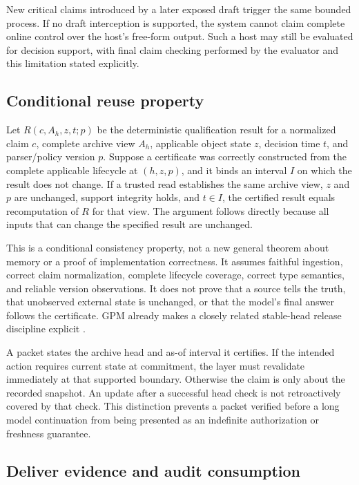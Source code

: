 New critical claims introduced by a later exposed draft trigger the same
bounded process. If no draft interception is supported, the system
cannot claim complete online control over the host's free-form output.
Such a host may still be evaluated for decision support, with final
claim checking performed by the evaluator and this limitation stated
explicitly.

\subsection{Conditional reuse
property}\label{conditional-reuse-property}

Let \(R(c,A_h,z,t;p)\) be the deterministic qualification result for a
normalized claim \(c\), complete archive view \(A_h\), applicable object
state \(z\), decision time \(t\), and parser/policy version \(p\).
Suppose a certificate was correctly constructed from the complete
applicable lifecycle at \((h,z,p)\), and it binds an interval \(I\) on
which the result does not change. If a trusted read establishes the same
archive view, \(z\) and \(p\) are unchanged, support integrity holds,
and \(t\in I\), the certified result equals recomputation of \(R\) for
that view. The argument follows directly because all inputs that can
change the specified result are unchanged.

This is a conditional consistency property, not a new general theorem
about memory or a proof of implementation correctness. It assumes
faithful ingestion, correct claim normalization, complete lifecycle
coverage, correct type semantics, and reliable version observations. It
does not prove that a source tells the truth, that unobserved external
state is unchanged, or that the model's final answer follows the
certificate. GPM already makes a closely related stable-head release
discipline explicit \citep{xu2026gpm}.

A packet states the archive head and as-of interval it certifies. If the
intended action requires current state at commitment, the layer must
revalidate immediately at that supported boundary. Otherwise the claim
is only about the recorded snapshot. An update after a successful head
check is not retroactively covered by that check. This distinction
prevents a packet verified before a long model continuation from being
presented as an indefinite authorization or freshness guarantee.

\subsection{Deliver evidence and audit
consumption}\label{deliver-evidence-and-audit-consumption}

